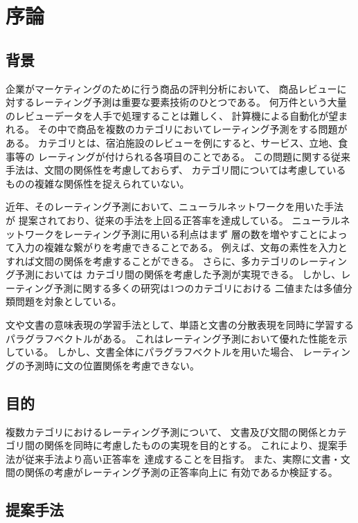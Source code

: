 \section{序論} \label{sec:Introduction}

\subsection{背景}

企業がマーケティングのために行う商品の評判分析において、
商品レビューに対するレーティング予測は重要な要素技術のひとつである。
何万件という大量のレビューデータを人手で処理することは難しく、
計算機による自動化が望まれる。
その中で商品を複数のカテゴリにおいてレーティング予測をする問題がある。
カテゴリとは、宿泊施設のレビューを例にすると、サービス、立地、食事等の
レーティングが付けられる各項目のことである。
この問題に関する従来手法\cite{fujitani15}は、文間の関係性を考慮しておらず、
カテゴリ間については考慮しているものの複雑な関係性を捉えられていない。

近年、そのレーティング予測において、ニューラルネットワークを用いた手法
\cite{nal14,rie14,duyu15}が
提案されており、従来の手法を上回る正答率を達成している。
ニューラルネットワークをレーティング予測に用いる利点はまず
層の数を増やすことによって入力の複雑な繋がりを考慮できることである。
例えば、文毎の素性を入力とすれば文間の関係を考慮することができる。
さらに、多カテゴリのレーティング予測においては
カテゴリ間の関係を考慮した予測が実現できる。
しかし、レーティング予測に関する多くの研究は1つのカテゴリにおける
二値または多値分類問題を対象としている。

文や文書の意味表現の学習手法として、単語と文書の分散表現を同時に学習する
パラグラフベクトル\cite{quoc14}がある。
これはレーティング予測において優れた性能を示している。
しかし、文書全体にパラグラフベクトルを用いた場合、
レーティングの予測時に文の位置関係を考慮できない。


\subsection{目的}

複数カテゴリにおけるレーティング予測について、
文書及び文間の関係とカテゴリ間の関係を同時に考慮したものの実現を目的とする。
これにより、提案手法が従来手法\cite{fujitani15}より高い正答率を
達成することを目指す。
また、実際に文書・文間の関係の考慮がレーティング予測の正答率向上に
有効であるか検証する。


\subsection{提案手法}

